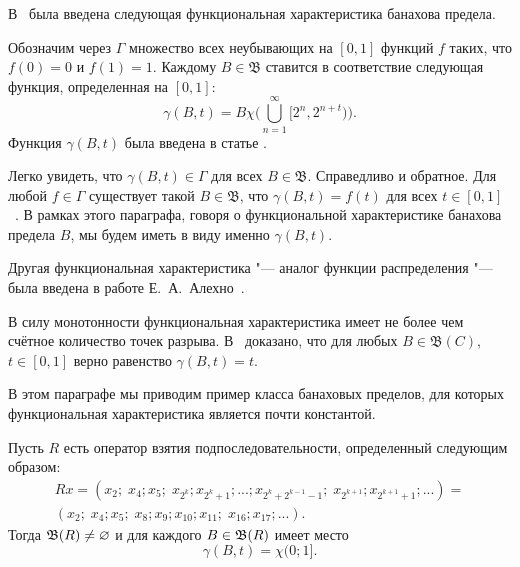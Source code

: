 \label{par:signature_gamma}

В~\cite{semenov2019mainclasses_rus} была введена следующая функциональная характеристика банахова предела.

Обозначим через $\Gamma$ множество всех неубывающих на $[0, 1]$ функций $f$ таких,
что $f(0) = 0$ и $f(1) = 1$. Каждому $B \in \mathfrak B$
ставится в соответствие следующая функция, определенная на $[0, 1]$:
$$
        \gamma(B, t) = B \chi\Bigg(\bigcup^\infty_{n = 1} [2^n, 2^{n + t})\Bigg)
        .
$$
Функция $\gamma(B,t)$ была введена в статье \cite{semenov2019mainclasses_rus}.

Легко увидеть, что $\gamma (B, t) \in \Gamma$ для всех $B \in \mathfrak B$.
Справедливо и обратное. Для любой $f \in \Gamma$ существует такой
$B \in \mathfrak B$, что $\gamma(B, t) = f(t)$ для всех
$t \in [0, 1]$~\cite[Предложение 2]{semenov2019mainclasses_rus}.
В рамках этого параграфа, говоря о функциональной характеристике банахова предела $B$,
мы будем иметь в виду именно $\gamma(B,t)$.

Другая функциональная характеристика "--- аналог функции распределения "--- была введена в работе Е.~А.~Алехно~\cite{alekhno2015banach}.

В силу монотонности функциональная характеристика имеет не более чем счётное количество точек разрыва.
В~\cite[Теорема 23]{semenov2019mainclasses_rus} доказано, что
для любых $B \in \mathfrak B(C)$, $t \in [0, 1]$ верно равенство $\gamma (B, t) = t$.

В этом параграфе мы приводим пример класса банаховых пределов,
для которых функциональная характеристика является почти константой.

\begin{proposition}
    Пусть $R$ есть оператор взятия подпоследовательности, определенный следующим образом:
	\begin{multline}
		\label{eq:sprawling_R}
		Rx = (x_2; \; x_4; x_5; \; x_{2^k}; x_{2^k + 1}; ... ; x_{2^k + 2^{k-1} - 1}; \; x_{2^{k+1}}; x_{2^{k+1} + 1};...)
		=\\
		(x_2; \; x_4; x_5; \; x_8; x_9; x_{10}; x_{11}; \; x_{16}; x_{17}; ...)
		.
	\end{multline}
    Тогда $\mathfrak{B}(R) \ne\varnothing$ и для каждого $B\in \mathfrak{B}(R)$ имеет место
    \begin{equation}
        \gamma(B, t) = \chi(0;1]
        .
    \end{equation}
\end{proposition}


